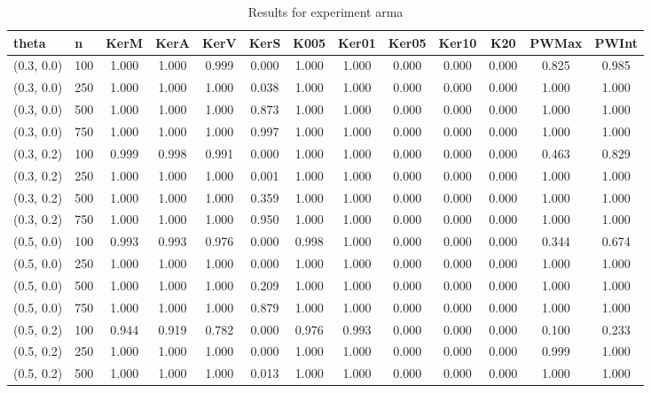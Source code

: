 \begin{table}[ht]
	\centering
	
	\caption{Results for experiment arma}
	\tiny{
		\begin{tabular}{ll|ccccccccccc}
			\hline
			theta & n & KerM & KerA & KerV & KerS & K005 & Ker01 & Ker05 & Ker10 & K20 & PWMax & PWInt \\
			\hline
			(0.3, 0.0) & 100 & 1.000 & 1.000 & 0.999 & 0.000 & 1.000 & 1.000 & 0.000 & 0.000 & 0.000 & 0.825 & 0.985 \\
			(0.3, 0.0) & 250 & 1.000 & 1.000 & 1.000 & 0.038 & 1.000 & 1.000 & 0.000 & 0.000 & 0.000 & 1.000 & 1.000 \\
			(0.3, 0.0) & 500 & 1.000 & 1.000 & 1.000 & 0.873 & 1.000 & 1.000 & 0.000 & 0.000 & 0.000 & 1.000 & 1.000 \\
			(0.3, 0.0) & 750 & 1.000 & 1.000 & 1.000 & 0.997 & 1.000 & 1.000 & 0.000 & 0.000 & 0.000 & 1.000 & 1.000 \\
			(0.3, 0.2) & 100 & 0.999 & 0.998 & 0.991 & 0.000 & 1.000 & 1.000 & 0.000 & 0.000 & 0.000 & 0.463 & 0.829 \\
			(0.3, 0.2) & 250 & 1.000 & 1.000 & 1.000 & 0.001 & 1.000 & 1.000 & 0.000 & 0.000 & 0.000 & 1.000 & 1.000 \\
			(0.3, 0.2) & 500 & 1.000 & 1.000 & 1.000 & 0.359 & 1.000 & 1.000 & 0.000 & 0.000 & 0.000 & 1.000 & 1.000 \\
			(0.3, 0.2) & 750 & 1.000 & 1.000 & 1.000 & 0.950 & 1.000 & 1.000 & 0.000 & 0.000 & 0.000 & 1.000 & 1.000 \\
			(0.5, 0.0) & 100 & 0.993 & 0.993 & 0.976 & 0.000 & 0.998 & 1.000 & 0.000 & 0.000 & 0.000 & 0.344 & 0.674 \\
			(0.5, 0.0) & 250 & 1.000 & 1.000 & 1.000 & 0.000 & 1.000 & 1.000 & 0.000 & 0.000 & 0.000 & 1.000 & 1.000 \\
			(0.5, 0.0) & 500 & 1.000 & 1.000 & 1.000 & 0.209 & 1.000 & 1.000 & 0.000 & 0.000 & 0.000 & 1.000 & 1.000 \\
			(0.5, 0.0) & 750 & 1.000 & 1.000 & 1.000 & 0.879 & 1.000 & 1.000 & 0.000 & 0.000 & 0.000 & 1.000 & 1.000 \\
			(0.5, 0.2) & 100 & 0.944 & 0.919 & 0.782 & 0.000 & 0.976 & 0.993 & 0.000 & 0.000 & 0.000 & 0.100 & 0.233 \\
			(0.5, 0.2) & 250 & 1.000 & 1.000 & 1.000 & 0.000 & 1.000 & 1.000 & 0.000 & 0.000 & 0.000 & 0.999 & 1.000 \\
			(0.5, 0.2) & 500 & 1.000 & 1.000 & 1.000 & 0.013 & 1.000 & 1.000 & 0.000 & 0.000 & 0.000 & 1.000 & 1.000 \\

\end{tabular}}
\end{table}
